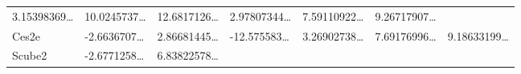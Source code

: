 \documentclass[
]{article}
\begin{document}
\begin{longtable}[]{@{}lllllll@{}}
\begin{minipage}[t]{0.12\columnwidth}
3.15398369\ldots{}\strut
\end{minipage} & \begin{minipage}[t]{0.12\columnwidth}\raggedright
10.0245737\ldots{}\strut
\end{minipage} & \begin{minipage}[t]{0.12\columnwidth}\raggedright
12.6817126\ldots{}\strut
\end{minipage} & \begin{minipage}[t]{0.12\columnwidth}\raggedright
2.97807344\ldots{}\strut
\end{minipage} & \begin{minipage}[t]{0.12\columnwidth}\raggedright
7.59110922\ldots{}\strut
\end{minipage} & \begin{minipage}[t]{0.12\columnwidth}\raggedright
9.26717907\ldots{}\strut
\end{minipage}\tabularnewline
\begin{minipage}[t]{0.08\columnwidth}\raggedright
Ces2e\strut
\end{minipage} & \begin{minipage}[t]{0.12\columnwidth}\raggedright
-2.6636707\ldots{}\strut
\end{minipage} & \begin{minipage}[t]{0.12\columnwidth}\raggedright
2.86681445\ldots{}\strut
\end{minipage} & \begin{minipage}[t]{0.12\columnwidth}\raggedright
-12.575583\ldots{}\strut
\end{minipage} & \begin{minipage}[t]{0.12\columnwidth}\raggedright
3.26902738\ldots{}\strut
\end{minipage} & \begin{minipage}[t]{0.12\columnwidth}\raggedright
7.69176996\ldots{}\strut
\end{minipage} & \begin{minipage}[t]{0.12\columnwidth}\raggedright
9.18633199\ldots{}\strut
\end{minipage}\tabularnewline
\begin{minipage}[t]{0.08\columnwidth}\raggedright
Scube2\strut
\end{minipage} & \begin{minipage}[t]{0.12\columnwidth}\raggedright
-2.6771258\ldots{}\strut
\end{minipage} & \begin{minipage}[t]{0.12\columnwidth}\raggedright
6.83822578\ldots{}\strut

\end{minipage}
\end{longtable}
\end{document}

